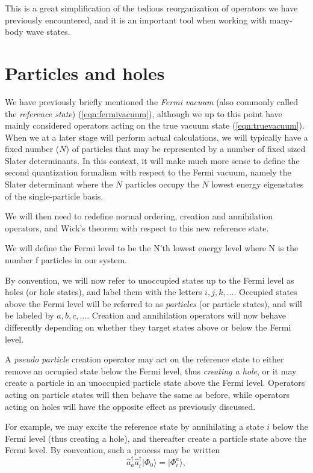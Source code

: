 This is a great simplification of the tedious reorganization of
operators we have previously encountered, and it is an important tool
when working with many-body wave states.

\section{Particles and holes}

We have previously briefly mentioned the \emph{Fermi vacuum} (also
commonly called the \emph{reference state}) (\ref{eqn:fermivacuum}),
although we up to this point have mainly considered operators acting
on the true vacuum state (\ref{eqn:truevacuum}). When we at a later
stage will perform actual calculations, we will typically have a fixed
number ($N$) of particles that may be represented by a number of fixed
sized Slater determinants. In this context, it will make much more sense to define the
second quantization formalism with respect to the Fermi vacuum, namely
the Slater determinant  where the $N$ particles occupy the $N$ lowest energy eigenstates
of the single-particle basis.

We will then need to redefine normal ordering, creation and
annihilation operators, and Wick's theorem with respect to this new
reference state.

We will define the Fermi level to be the N'th lowest energy level where N is the number f particles in our system.

By convention, we will now refer to unoccupied states up to the Fermi
level as holes (or hole states), and label them with the letters
$i,j,k,...$. Occupied states above the Fermi level will be referred to
as \emph{particles} (or particle states), and will be labeled
by $a,b,c,...$. Creation and annihilation operators will now behave
differently depending on whether they target states above or below the
Fermi level.

A \emph{pseudo particle} creation operator may act on the reference
state to either remove an occupied state below the Fermi level, thus
\emph{creating a hole}, or it may create a particle in an unoccupied
particle state above the Fermi level. Operators acting on particle
states will then behave the same as before, while operators acting on
holes will have the opposite effect as previously discussed.

For example, we may excite the reference state by annihilating a state
$i$ below the Fermi level (thus creating a hole), and thereafter
create a particle state above the Fermi level. By convention, such a
process may be written
\begin{equation}
\hat{a}_a^\dagger \hat{a}_i^\dagger \vert \Phi_0 \rangle = \vert \Phi_i^a \rangle,
\label{eqn:excitation}
\end{equation}

